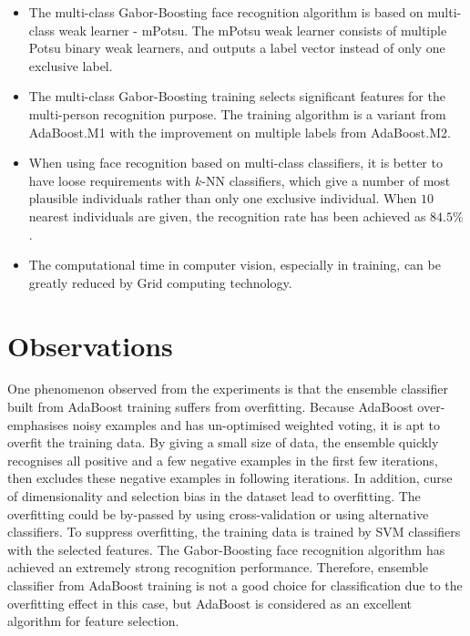 \begin{itemize}
 \item The multi-class Gabor-Boosting face recognition algorithm is based on multi-class weak learner - mPotsu. The mPotsu weak learner consists of multiple Potsu binary weak learners, and outputs a label vector instead of only one exclusive label.
 \item The multi-class Gabor-Boosting training selects significant features for the multi-person recognition purpose. The training algorithm is a variant from \mbox{AdaBoost.M1} with the improvement on multiple labels from \mbox{AdaBoost.M2}.
 \item When using face recognition based on multi-class classifiers, it is better to have loose requirements with $k$-NN classifiers, which give a number of most plausible individuals rather than only one exclusive individual. When $10$ nearest individuals are given, the recognition rate has been achieved as $84.5\%$.
 \item The computational time in computer vision, especially in training, can be greatly reduced by Grid computing technology.
\end{itemize}


\section{Observations}
One phenomenon observed from the experiments is that the ensemble classifier built from AdaBoost training suffers from overfitting. Because AdaBoost over-emphasises noisy examples and has un-optimised weighted voting, it is apt to overfit the training data. By giving a small size of data, the ensemble quickly recognises all positive and a few negative examples in the first few iterations, then excludes these negative examples in following iterations. In addition, curse of dimensionality and selection bias in the dataset lead to overfitting. The overfitting could be by-passed by using cross-validation or using alternative classifiers. To suppress overfitting, the training data is trained by SVM classifiers with the selected features. The Gabor-Boosting face recognition algorithm has achieved an extremely strong recognition performance. Therefore, ensemble classifier from AdaBoost training is not a good choice for classification due to the overfitting effect in this case, but AdaBoost is considered as an excellent algorithm for feature selection.

